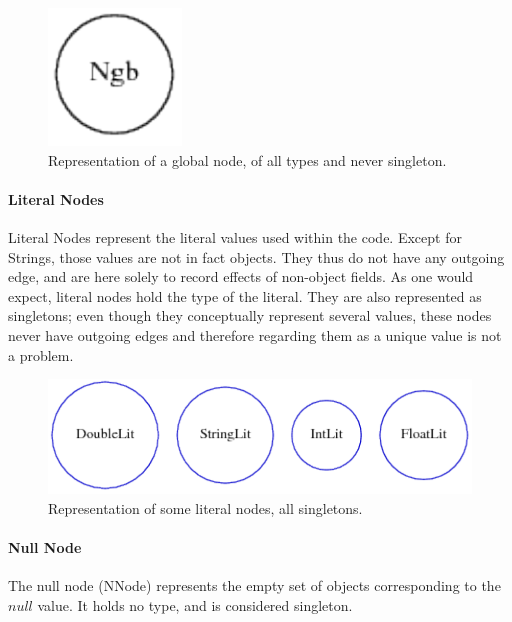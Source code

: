 \begin{figure}[h]
    \centering

    \includegraphics{images/pt_gbnodes}

    \caption{Representation of a global node, of all types and never singleton.}
    \label{fig:pt:gbnodes}
\end{figure}

\paragraph{Literal Nodes} Literal Nodes represent the literal values used
within the code. Except for Strings, those values are not in fact objects.
They thus do not have any outgoing edge, and are here solely to record effects
of non-object fields. As one would expect, literal nodes hold the type of the
literal.  They are also represented as singletons; even though they
conceptually represent several values, these nodes never have outgoing edges
and therefore regarding them as a unique value is not a problem.

\begin{figure}[h]
    \centering

    \includegraphics{images/pt_litnodes}

    \caption{Representation of some literal nodes, all singletons.}
    \label{fig:pt:litnodes}
\end{figure}


\paragraph{Null Node} The null node (NNode) represents the empty set of objects
corresponding to the $null$ value. It holds no type, and is considered singleton.


